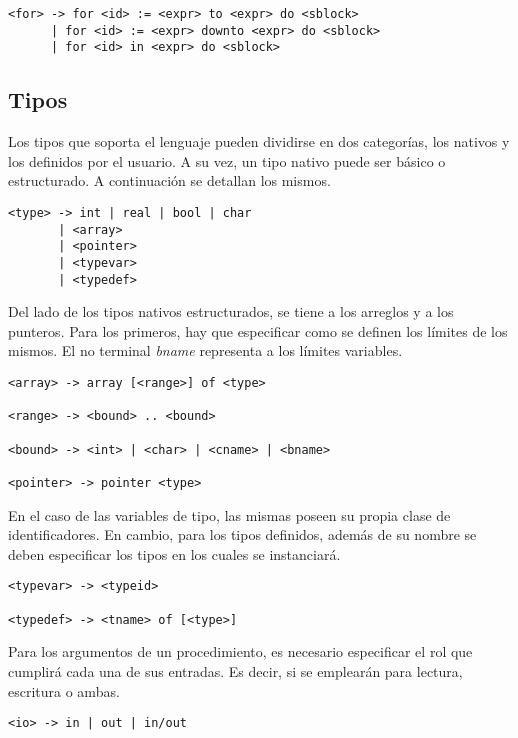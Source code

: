 \documentclass{article}
\begin{document}
\begin{lstlisting}[style = syntax]
<for> -> for <id> := <expr> to <expr> do <sblock>
      | for <id> := <expr> downto <expr> do <sblock>
      | for <id> in <expr> do <sblock>
\end{lstlisting}

\subsection{Tipos}

Los tipos que soporta el lenguaje pueden dividirse en dos categorías, los nativos y los definidos por el usuario.
A su vez, un tipo nativo puede ser básico o estructurado.
A continuación se detallan los mismos.

\begin{lstlisting}[style = syntax]
<type> -> int | real | bool | char
       | <array>
       | <pointer>
       | <typevar>
       | <typedef>
\end{lstlisting}

Del lado de los tipos nativos estructurados, se tiene a los arreglos y a los punteros.
Para los primeros, hay que especificar como se definen los límites de los mismos.
El no terminal \textit{bname} representa a los límites variables.

\begin{lstlisting}[style = syntax]
<array> -> array [<range>] of <type>

<range> -> <bound> .. <bound>

<bound> -> <int> | <char> | <cname> | <bname>

<pointer> -> pointer <type>
\end{lstlisting}

En el caso de las variables de tipo, las mismas poseen su propia clase de identificadores.
En cambio, para los tipos definidos, además de su nombre se deben especificar los tipos en los cuales se instanciará.

\begin{lstlisting}[style = syntax]
<typevar> -> <typeid>

<typedef> -> <tname> of [<type>]
\end{lstlisting}

Para los argumentos de un procedimiento, es necesario especificar el rol que cumplirá cada una de sus entradas.
Es decir, si se emplearán para lectura, escritura o ambas.

\begin{lstlisting}[style = syntax]
<io> -> in | out | in/out
\end{lstlisting}
\end{document}
